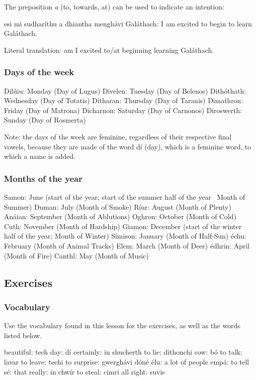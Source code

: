 The preposition \textit{a} (to, towards, at) can be used to indicate an intention:

esi mi sudhar\'{i}thu a dhiantha mengh\'{a}vi Gal\'{a}thach: I am excited to begin to learn Gal\'{a}thach.

Literal translation: am I excited to/at beginning learning Gal\'{a}thach.

\subsubsection{Days of the week}

Dil\'{u}iu: Monday (Day of Lugus)
Divelen: Tuesday (Day of Belenos)
Dith\'{o}thath: Wednesday (Day of Totatis)
Ditharan: Thursday (Day of Taranis)
Dimathron: Friday (Day of Matrona)
Dicharnon: Saturday (Day of Carnonos)
Diroswerth: Sunday (Day of Rosmerta)

Note: the days of the week are feminine, regardless of their respective final vowels, because they are made of the word d\'{i} (day), which is a feminine word, to which a name is added.

\subsubsection{Months of the year}

Samon: June (start of the year; start of the summer half of the year \textendash\ Month of Summer)
Duman: July (Month of Smoke)
R\'{i}ur: August (Month of Plenty)
An\'{a}ian: September (Month of Ablutions)
Oghron: October (Month of Cold)
Cuth: November (Month of Hardship)
Giamon: December (start of the winter half of the year; Month of Winter)
Simison: January (Month of Half-Sun)
\'{e}chu: February (Month of Animal Tracks)
Elem: March (Month of Deer)
\'{e}dhrin: April (Month of Fire)
Canthl: May (Month of Music)

\newpage
\subsection{Exercises}

\subsubsection{Vocabulary}

Use the vocabulary found in this lesson for the exercises, as well as the words listed below.

beautiful: tech
day: d\'{i}
certainly: in shucherth
to lie: dithonchi
cow: b\'{o}
to talk: lavar
to leave: techi
to surprise: gwergh\'{a}vi
d\'{o}n\'{e} \'{e}lu: a lot of people
emp\'{a}: to tell
s\'{e}: that
really: in chw\'{i}r
to steal: cimri
all right: suvis

